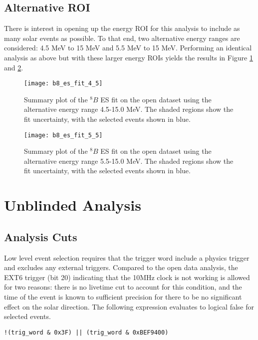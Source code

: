 \subsection{Alternative ROI}

There is interest in opening up the energy ROI for this analysis to include as many solar events as possible.
To that end, two alternative energy ranges are considered: 4.5 MeV to 15 MeV and 5.5 MeV to 15 MeV.
Performing an identical analysis as above but with these larger energy ROIs yields the results in Figure \ref{fig:solar:open45} and \ref{fig:solar:open55}.

\begin{figure}
\centering
\texttt{[image: b8\_es\_fit\_4\_5]}
\caption{
Summary plot of the $^8B$ ES fit on the open dataset using the alternative energy range 4.5-15.0 MeV.
The shaded regions show the fit uncertainty, with the selected events shown in blue.
}
\label{fig:solar:open45}
\end{figure}

\begin{figure}
\centering
\texttt{[image: b8\_es\_fit\_5\_5]}
\caption{
Summary plot of the $^8B$ ES fit on the open dataset using the alternative energy range 5.5-15.0 MeV.
The shaded regions show the fit uncertainty, with the selected events shown in blue.
}
\label{fig:solar:open55}
\end{figure}

\section{Unblinded Analysis}
\label{sec:solar:unblinded}

\subsection{Analysis Cuts}
\label{sec:solar:unblind_cuts}

Low level event selection requires that the trigger word include a physics
trigger and excludes any external triggers.
Compared to the open data analysis, the EXT6 trigger (bit 20) indicating 
that the 10MHz clock is not working is allowed for two reasons: there is no
livetime cut to account for this condition, and the time of the event is 
known to sufficient precision for there to be no significant effect on the 
solar direction.
The following expression evaluates to logical false for selected events.

\begin{verbatim}
!(trig_word & 0x3F) || (trig_word & 0xBEF9400)
\end{verbatim}

